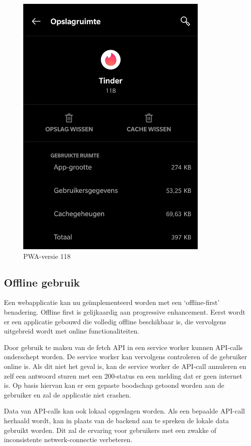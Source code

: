 	\begin{figure}[H]
		\centering
		\includegraphics{./img/tinder_pwa.png}
		\caption{PWA-versie 118}
	\end{figure}

\subsection{Offline gebruik}
	Een webapplicatie kan nu geïmplementeerd worden met een ‘offline-first’ benadering. Offline first is gelijkaardig aan progressive enhancement. Eerst wordt er een applicatie gebouwd die volledig offline beschikbaar is, die vervolgens uitgebreid wordt met online functionaliteiten. 
	
	Door gebruik te maken van de fetch API in een service worker kunnen API-calls onderschept worden. De service worker kan vervolgens controleren of de gebruiker online is. Als dit niet het geval is, kan de service worker de API-call annuleren en zelf een antwoord sturen met een 200-status en een melding dat er geen internet is. Op basis hiervan kan er een gepaste boodschap getoond worden aan de gebruiker en zal de applicatie niet crashen.
	\autocite{Developers2019a}
	
	Data van API-calls kan ook lokaal opgeslagen worden. Als een bepaalde API-call herhaald wordt, kan in plaats van de backend aan te spreken de lokale data gebruikt worden. Dit zal de ervaring voor gebruikers met een zwakke of inconsistente netwerk-connectie verbeteren.
	\autocite{Vanhala2017}
	

